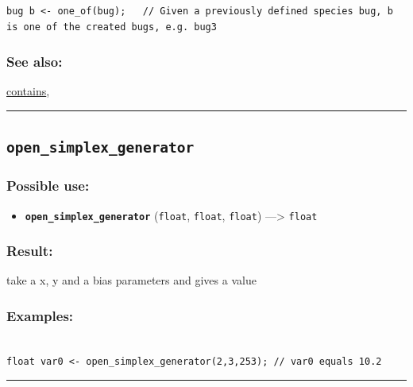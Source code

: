 \documentclass[]{book}
\providecommand{\tightlist}{%
  \setlength{\itemsep}{0pt}\setlength{\parskip}{0pt}}
\theoremstyle{definition}
\theoremstyle{definition}
\theoremstyle{definition}
\theoremstyle{remark}
\begin{document}
\begin{verbatim}
bug b <- one_of(bug);   // Given a previously defined species bug, b is one of the created bugs, e.g. bug3 
\end{verbatim}

\subsubsection{See also:}\label{see-also-151}

\href{operators-b-to-c.html\#contains}{contains},

\begin{center}\rule{0.5\linewidth}{\linethickness}\end{center}

\subsection{\texorpdfstring{\texttt{open\_simplex\_generator}}{open\_simplex\_generator}}\label{open_simplex_generator}

\subsubsection{Possible use:}\label{possible-use-384}

\begin{itemize}
\tightlist
\item
  \textbf{\texttt{open\_simplex\_generator}} (\texttt{float},
  \texttt{float}, \texttt{float}) ---\textgreater{} \texttt{float}
\end{itemize}

\subsubsection{Result:}\label{result-370}

take a x, y and a bias parameters and gives a value

\subsubsection{Examples:}\label{examples-263}

\begin{verbatim}
 
float var0 <- open_simplex_generator(2,3,253); // var0 equals 10.2
\end{verbatim}

\begin{center}\rule{0.5\linewidth}{\linethickness}\end{center}
\end{document}
